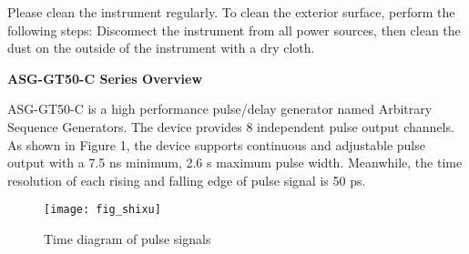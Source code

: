 \vspace{0.7cm}

\vspace{0.2cm}
\hspace{-0.4cm}Please clean the instrument regularly. To clean the exterior surface, perform the following steps: Disconnect the instrument from all power sources, then clean the dust on the outside of the instrument with a dry cloth.

%

\newpage
\noindent\huge \textbf{ASG-GT50-C Series Overview} 
\vspace{0.6cm}

\normalsize ASG-GT50-C is a high performance pulse/delay generator named Arbitrary Sequence Generators. The device provides 8 independent pulse output channels. As shown in Figure 1, the device supports continuous and adjustable pulse output with a 7.5 ns minimum, 2.6 s maximum pulse width. Meanwhile, the time resolution of each rising and falling edge of pulse signal is 50 ps.
\begin{figure}[ht]
\centering
\texttt{[image: fig\_shixu]}
\caption{\hspace{0.3cm}Time diagram of pulse signals}\label{fig:fig1}
\end{figure}
\vspace{0.5cm}

